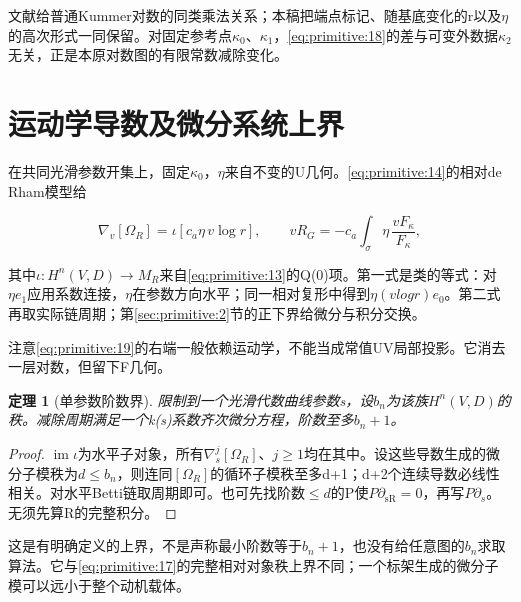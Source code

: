 \documentclass[11pt,a4paper,oneside]{ctexrep}
\theoremstyle{cnplain}
\newtheorem{theorem}{定理}[chapter]
\theoremstyle{definition}
\theoremstyle{remark}
\begin{document}
文献\cite{brownperiods}给普通Kummer对数的同类乘法关系；本稿把端点标记、随基底变化的r以及\(\eta \)的高次形式一同保留。对固定参考点\(\kappa _0\)、\(\kappa _1\)，\eqref{eq:primitive:18}的差与可变外数据\(\kappa _2\)无关，正是本原对数图的有限常数减除变化。

\section{运动学导数及微分系统上界}\label{sec:primitive:7}

在共同光滑参数开集上，固定\(\kappa _0\)，\(\eta \)来自不变的U几何。\eqref{eq:primitive:14}的相对de Rham模型给

\begin{equation}
\nabla_v[\Omega_R]=\iota\!\left[c_a\eta\,v\log r\right],\qquad
 vR_G=-c_a\int_\sigma\eta\,\frac{vF_\kappa}{F_\kappa},          \label{eq:primitive:19}
\end{equation}

其中\(\iota:H^n(V,D)\to M_R\)来自\eqref{eq:primitive:13}的Q(0)项。第一式是类的等式：对\(\eta e_1\)应用系数连接，\(\eta \)在参数方向水平；同一相对复形中得到\(\eta (vlog r)e_0\)。第二式再取实际链周期；第\ref{sec:primitive:2}节的正下界给微分与积分交换。

注意\eqref{eq:primitive:19}的右端一般依赖运动学，不能当成常值UV局部投影。它消去一层对数，但留下F几何。

\begin{theorem}[单参数阶数界]

\label{thm:primitive:7.1} 限制到一个光滑代数曲线参数s，设\(b_n\)为该族\(H^n(V,D)\)的秩。减除周期满足一个k(s)系数齐次微分方程，阶数至多\(b_n+1\)。

\end{theorem}

\begin{proof}

\(\operatorname{im}\iota\)为水平子对象，所有\(\nabla _s^j[\Omega _R]\)、\(j\ge 1\)均在其中。设这些导数生成的微分子模秩为\(d\le b_n\)，则连同\([\Omega _R]\)的循环子模秩至多d+1；d+2个连续导数必线性相关。对水平Betti链取周期即可。也可先找阶数\(\le d\)的P使\(P\partial _{\mathrm{sR}}=0\)，再写\(P\partial _s\)。无须先算R的完整积分。

\end{proof}

这是有明确定义的上界，不是声称最小阶数等于\(b_n+1\)，也没有给任意图的\(b_n\)求取算法。它与\eqref{eq:primitive:17}的完整相对对象秩上界不同；一个标架生成的微分子模可以远小于整个动机载体。
\end{document}
